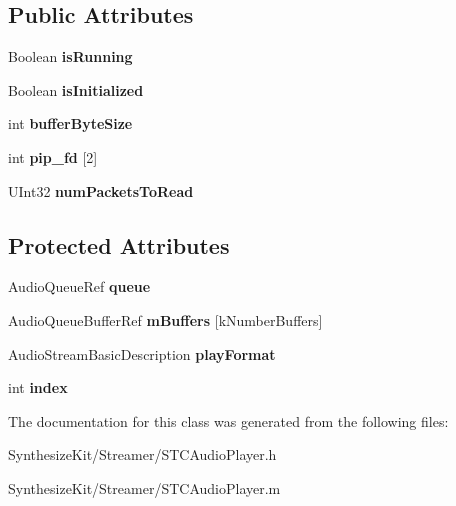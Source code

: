 \subsection*{Public Attributes}
\begin{DoxyCompactItemize}
\item 
\hypertarget{interface_s_t_c_audio_player_aea51e1434e5c499eaee55787949260a4}{}\label{interface_s_t_c_audio_player_aea51e1434e5c499eaee55787949260a4} 
Boolean {\bfseries is\+Running}
\item 
\hypertarget{interface_s_t_c_audio_player_ade2dc02adba6b94aaa8556281b20e055}{}\label{interface_s_t_c_audio_player_ade2dc02adba6b94aaa8556281b20e055} 
Boolean {\bfseries is\+Initialized}
\item 
\hypertarget{interface_s_t_c_audio_player_aa96edc84ac3bd01a9683efd034d5312f}{}\label{interface_s_t_c_audio_player_aa96edc84ac3bd01a9683efd034d5312f} 
int {\bfseries buffer\+Byte\+Size}
\item 
\hypertarget{interface_s_t_c_audio_player_a45d9b02a87375134d072e510e4bcedad}{}\label{interface_s_t_c_audio_player_a45d9b02a87375134d072e510e4bcedad} 
int {\bfseries pip\+\_\+fd} \mbox{[}2\mbox{]}
\item 
\hypertarget{interface_s_t_c_audio_player_a4de29eb13cd48c2533e289e3fb64187b}{}\label{interface_s_t_c_audio_player_a4de29eb13cd48c2533e289e3fb64187b} 
U\+Int32 {\bfseries num\+Packets\+To\+Read}
\end{DoxyCompactItemize}
\subsection*{Protected Attributes}
\begin{DoxyCompactItemize}
\item 
\hypertarget{interface_s_t_c_audio_player_ae4a01a5a58784dad7c318171d2627f8e}{}\label{interface_s_t_c_audio_player_ae4a01a5a58784dad7c318171d2627f8e} 
Audio\+Queue\+Ref {\bfseries queue}
\item 
\hypertarget{interface_s_t_c_audio_player_aee78cfad9c7107c7088204a14940ec18}{}\label{interface_s_t_c_audio_player_aee78cfad9c7107c7088204a14940ec18} 
Audio\+Queue\+Buffer\+Ref {\bfseries m\+Buffers} \mbox{[}k\+Number\+Buffers\mbox{]}
\item 
\hypertarget{interface_s_t_c_audio_player_afcd717630ef5f7bd48da739d695e30c8}{}\label{interface_s_t_c_audio_player_afcd717630ef5f7bd48da739d695e30c8} 
Audio\+Stream\+Basic\+Description {\bfseries play\+Format}
\item 
\hypertarget{interface_s_t_c_audio_player_a3e80a4e04f58e971fd4e2a95e2bbb265}{}\label{interface_s_t_c_audio_player_a3e80a4e04f58e971fd4e2a95e2bbb265} 
int {\bfseries index}
\end{DoxyCompactItemize}


The documentation for this class was generated from the following files\+:\begin{DoxyCompactItemize}
\item 
Synthesize\+Kit/\+Streamer/S\+T\+C\+Audio\+Player.\+h\item 
Synthesize\+Kit/\+Streamer/S\+T\+C\+Audio\+Player.\+m\end{DoxyCompactItemize}
